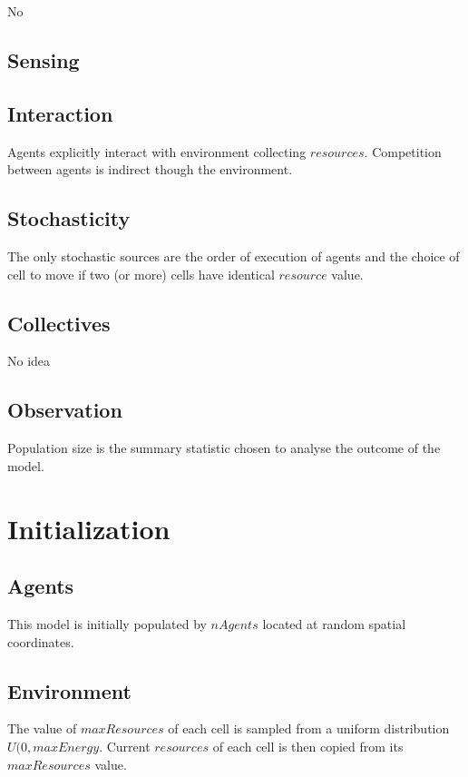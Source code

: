 \message{ !name(odd_decision_making.tex)}\documentclass[11pt,a4paper,twocolumn,notitlepage]{article}
\begin{document}
No

\subsection{Sensing}

\subsection{Interaction}

Agents explicitly interact with environment collecting $resources$. Competition between agents is indirect though the environment.

\subsection{Stochasticity}

The only stochastic sources are the order of execution of agents and the choice of cell to move if two (or more) cells have identical $resource$ value.

\subsection{Collectives}

No idea

\subsection{Observation}

Population size is the summary statistic chosen to analyse the outcome of the model.

\section{Initialization}

\subsection{Agents}

This model is initially populated by $nAgents$ located at random spatial coordinates.

\subsection{Environment}

The value of $maxResources$ of each cell is sampled from a uniform distribution $U(0,maxEnergy$. Current $resources$ of each cell is then copied from its $maxResources$ value.
\end{document}
